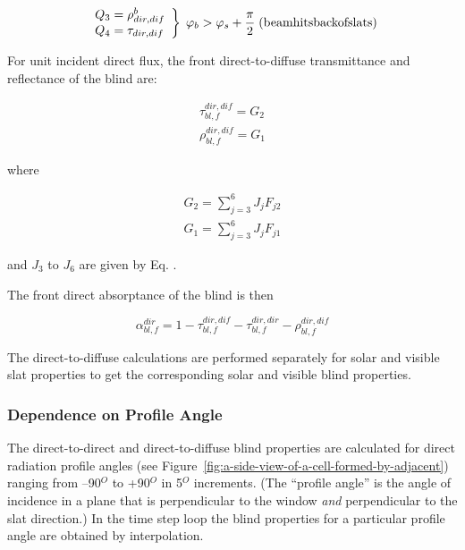 \begin{equation}
\left.
    \begin{array}{l}
      Q_3 = \rho_{dir,dif}^b \\
      Q_4 = \tau_{dir,dif}
    \end{array}
  \right\}
  \;
  \varphi_b > \varphi_s + \frac{\pi }{2}
  \;
  \rm{ (beam hits back of slats)}
\end{equation}

For unit incident direct flux, the front direct-to-diffuse transmittance and reflectance of the blind are:

\begin{equation}
  \begin{array}{l}
    \tau_{bl,f}^{dir,dif} = {G_2} \\
    \rho_{bl,f}^{dir,dif} = {G_1}
  \end{array}
\end{equation}

where

\begin{equation}
  \begin{array}{l}
    G_2 = \sum_{j = 3}^6 J_j F_{j2} \\
    G_1 = \sum_{j = 3}^6 J_j F_{j1} 
  \end{array}
\end{equation}

and \({J_3}\) to \({J_6}\) are given by Eq. .~

The front direct absorptance of the blind is then

\begin{equation}
\alpha_{bl,f}^{dir} = 1 - \tau_{bl,f}^{dir,dif} - \tau_{bl,f}^{dir,dir} - \rho_{bl,f}^{dir,dif}
\end{equation}

The direct-to-diffuse calculations are performed separately for solar and visible slat properties to get the corresponding solar and visible blind properties.

\subsubsection{Dependence on Profile Angle}\label{dependence-on-profile-angle}

The direct-to-direct and direct-to-diffuse blind properties are calculated for direct radiation profile angles (see Figure~\ref{fig:a-side-view-of-a-cell-formed-by-adjacent}) ranging from --90\(^{O}\) to +90\(^{O}\) in 5\(^{O}\) increments. (The ``profile angle'' is the angle of incidence in a plane that is perpendicular to the window \emph{and} perpendicular to the slat direction.) In the time step loop the blind properties for a particular profile angle are obtained by interpolation.

